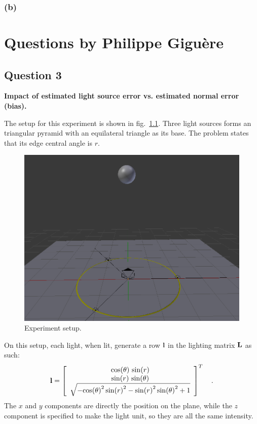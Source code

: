 \documentclass{report}
\begin{document}
\subsection{(b)}

\chapter{Questions by Philippe Giguère}

\section{Question 3}

\textbf{Impact of estimated light source error vs. estimated normal error (bias).}

The setup for this experiment is shown in fig.~\ref{q3:setup}. Three light sources forms an triangular pyramid with an equilateral triangle as its base. The problem states that its edge central angle is $r$.

\begin{figure}
  \centering
  \includegraphics[width=0.9\linewidth]{q3_setup.png}
  \caption[Experiment setup]
   {Experiment setup.}
  \label{q3:setup}
\end{figure}

On this setup, each light, when lit, generate a row $\mathbf{l}$ in the lighting matrix $\mathbf{L}$ as such:
\begin{equation}
\B{l} =
\left[\begin{array}{c} \cos\!\left(\theta\right)\, \sin\!\left(r\right) \\ \sin\!\left(r\right)\, \sin\!\left(\theta\right) \\ \sqrt{ - {\cos\!\left(\theta\right)}^2\, {\sin\!\left(r\right)}^2 - {\sin\!\left(r\right)}^2\, {\sin\!\left(\theta\right)}^2 + 1} \end{array}\right]^T
\quad .
\end{equation}
The $x$ and $y$ components are directly the position on the plane, while the $z$ component is specified to make the light unit, so they are all the same intensity.
\end{document}
